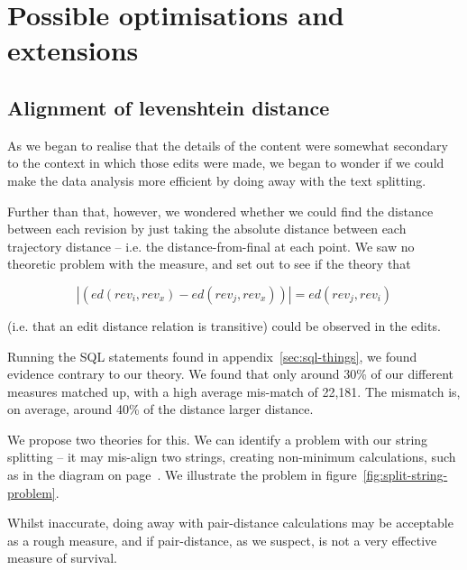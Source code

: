 \section{Possible optimisations and extensions}
\subsection*{Alignment of levenshtein distance}
\label{split-distance-eval}
As we began to realise that the details of the content were somewhat
secondary to the context in which those edits were made, we began to
wonder if we could make the data analysis more efficient by doing away
with the text splitting.

Further than that, however, we wondered whether we could find the
distance between each revision by just taking the absolute distance
between each trajectory distance -- i.e. the distance-from-final at
each point. We saw no theoretic problem with the measure, and set out
to see if the theory that

\[
  |(ed(rev_i,rev_x) - ed(rev_j,rev_x))| = ed(rev_j,rev_i)
\]

(i.e. that an edit distance relation is transitive) could be observed
in the edits. 

Running the SQL statements found in appendix~\ref{sec:sql-things}, we
found evidence contrary to our theory. We found that only around 30\%
of our different measures matched up, with a high average mis-match of
22,181. The mismatch is, on average, around 40\% of the distance
larger distance. 

We propose two theories for this. We can identify a problem with our
string splitting -- it may mis-align two strings, creating non-minimum
calculations, such as in the diagram on page~\pageref{fig:sub-opt}. We
illustrate the problem in figure~\ref{fig:split-string-problem}.

Whilst inaccurate, doing away with pair-distance calculations may be
acceptable as a rough measure, and if pair-distance, as we suspect, is
not a very effective measure of survival.

